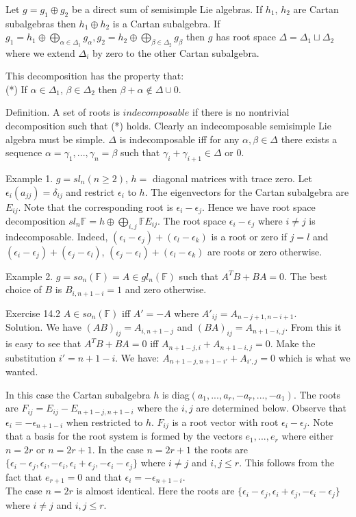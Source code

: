 \documentclass[11pt]{article}
\begin{document}
Let $g=g_1\oplus g_2$ be a direct sum of semisimple Lie algebras.  If $h_1$, $h_2$ are Cartan subalgebras then $h_1\oplus h_2$ is a Cartan subalgebra.  If $g_1 = h_1\oplus \bigoplus_{\alpha \in \Delta_1}  g_{\alpha}, g_2 = h_2\oplus \bigoplus_{\beta \in \Delta_2 } g_{\beta}$ then $g$ has root space $\Delta = \Delta_1 \sqcup \Delta_2$ where we extend $\Delta_i$ by zero to the other Cartan subalgebra.

This decomposition has the property that:\\
(*) If $\alpha \in \Delta_1$, $\beta \in \Delta_2$ then $\beta + \alpha \notin \Delta \cup 0$. 
 
Definition.  A set of roots is $indecomposable$ if there is no nontrivial decomposition such that (*) holds.
Clearly an indecomposable semisimple Lie algebra must be simple.   $\Delta$ is indecomposable iff for any $\alpha, \beta \in \Delta$ there exists a sequence $\alpha = \gamma_1, . . .,\gamma_n=\beta$ such that $\gamma_i+\gamma_{i+1} \in \Delta$ or $0$.

Example 1.  $g=sl_n (n \geq2)$, $h=$ diagonal matrices with trace zero.  Let $\epsilon_i(a_{jj})=\delta_{ij}$ and restrict $\epsilon_i$ to $h$.  The eigenvectors for the Cartan subalgebra are $E_{ij}$.  Note that the corresponding root is $\epsilon_i -\epsilon_j$.  Hence we have root space decomposition $sl_n\mathbb{F}=h\oplus\bigoplus_{i,j}\mathbb{F}E_{ij}$.  The root space $\epsilon_i-\epsilon_j$ where $i\neq j$ is indecomposable.  Indeed, $(\epsilon_i-\epsilon_j) +(\epsilon_l -\epsilon_k)$ is a root or zero if $j=l$ and $(\epsilon_i-\epsilon_j) +(\epsilon_j -\epsilon_l)$, $(\epsilon_j-\epsilon_l) +(\epsilon_l -\epsilon_k)$ are roots or zero otherwise.       

Example 2.  $g=so_n(\mathbb{F}) = A\in gl_n(\mathbb{F})$ such that $A^TB+BA=0$.  The best choice of $B$ is $B_{i,n+1-i}=1$ and zero otherwise.  

Exercise 14.2  $A\in so_n(\mathbb{F})$ iff $A'=-A$ where $A'_{ij}=A_{n-j+1,n-i+1}$. \\
Solution.  We have $(AB)_{ij}=A_{i,n+1-j}$ and $(BA)_{ij}=A_{n+1-i,j}$.  From this it is easy to see that $A^TB+BA=0$ iff $A_{n+1-j,i}+A_{n+1-i,j}=0$.  Make the substitution $i'=n+1-i$.  We have: $A_{n+1-j,n+1-i'}+A_{i',j}=0$ which is what we wanted.  

In this case the Cartan subalgebra $h$ is diag$(a_1, ...,a_r,-a_r, ...,-a_1)$.  The roots are $F_{ij}=E_{ij}-E_{n+1-j,n+1-i}$ where the $i,j$ are determined below.  Observe that $\epsilon_i=-\epsilon_{n+1-i}$ when restricted to $h$.  $F_{ij}$ is a root vector with root $\epsilon_i-\epsilon_j$.  Note that a basis for the root system is formed by the vectors $e_1, ..., e_r$ where either $n=2r$ or $n=2r+1$.  In the case $n=2r+1$ the roots are $\{ \epsilon_i-\epsilon_j, \epsilon_i, -\epsilon_i,\epsilon_i+\epsilon_j,-\epsilon_i-\epsilon_j \}$ where $i\neq j$ and $i,j \leq r$.  This follows from the fact that $e_{r+1}=0$ and that $\epsilon_i=-\epsilon_{n+1-i}$.\\  
The case $n=2r$ is almost identical.  Here the roots are $\{ \epsilon_i-\epsilon_j,\epsilon_i+\epsilon_j,-\epsilon_i-\epsilon_j \}$ where $i\neq j$ and $i,j \leq r$.  
\end{document}
